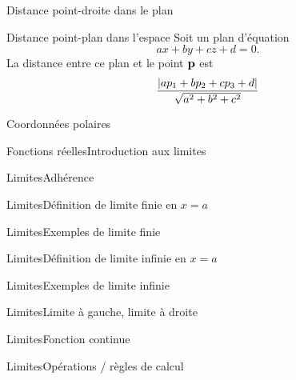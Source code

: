 \documentclass[french,t,handout,xcolor=svgnames]{beamer}
\begin{document}
\begin{frame}{Distance point-droite dans le plan}

\end{frame}
\begin{frame}{Distance point-plan dans l'espace}
  Soit un plan d'équation
  \begin{equation*}
    a x + b y + c z + d = 0.
  \end{equation*}
  La distance entre ce plan et le point \(\mathbf{p}\) est
  \begin{equation*}
    \frac{\left\vert a p_{1} + b p_{2} + c p_{3} + d\right\vert}{\sqrt{a^{2} + b^{2} + c^{2}}}
  \end{equation*}
\end{frame}
\begin{frame}{Coordonnées polaires}
  
\end{frame}
\begin{frame}{Fonctions réelles}{Introduction aux limites}
  
\end{frame}

\begin{frame}{Limites}{Adhérence}
  
\end{frame}
\begin{frame}{Limites}{Définition de limite finie en $x = a$}
  
\end{frame}
\begin{frame}{Limites}{Exemples de limite finie}
  
\end{frame}
\begin{frame}{Limites}{Définition de limite infinie en $x = a$}
  
\end{frame}
\begin{frame}{Limites}{Exemples de limite infinie}
  
\end{frame}
\begin{frame}{Limites}{Limite à gauche, limite à droite}
  
\end{frame}
\begin{frame}{Limites}{Fonction continue}

\end{frame}
\begin{frame}{Limites}{Opérations / règles de calcul}
  
\end{frame}
\end{document}
